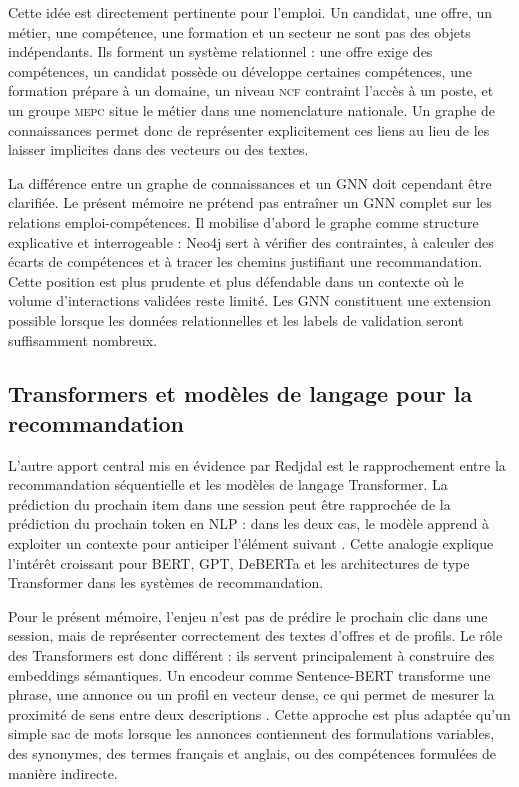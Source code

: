 \documentclass[12pt,twoside]{report}
\newcommand{\MEPC}{\textsc{mepc}}
\newcommand{\NCF}{\textsc{ncf}}
\begin{document}
Cette idée est directement pertinente pour l'emploi. Un candidat, une offre, un métier, une compétence, une formation et un secteur ne sont pas des objets indépendants. Ils forment un système relationnel : une offre exige des compétences, un candidat possède ou développe certaines compétences, une formation prépare à un domaine, un niveau \NCF{} contraint l'accès à un poste, et un groupe \MEPC{} situe le métier dans une nomenclature nationale. Un graphe de connaissances permet donc de représenter explicitement ces liens au lieu de les laisser implicites dans des vecteurs ou des textes.

La différence entre un graphe de connaissances et un GNN doit cependant être clarifiée. Le présent mémoire ne prétend pas entraîner un GNN complet sur les relations emploi-compétences. Il mobilise d'abord le graphe comme structure explicative et interrogeable : Neo4j sert à vérifier des contraintes, à calculer des écarts de compétences et à tracer les chemins justifiant une recommandation. Cette position est plus prudente et plus défendable dans un contexte où le volume d'interactions validées reste limité. Les GNN constituent une extension possible lorsque les données relationnelles et les labels de validation seront suffisamment nombreux.

\subsection{Transformers et modèles de langage pour la recommandation}
L'autre apport central mis en évidence par Redjdal est le rapprochement entre la recommandation séquentielle et les modèles de langage Transformer. La prédiction du prochain item dans une session peut être rapprochée de la prédiction du prochain token en NLP : dans les deux cas, le modèle apprend à exploiter un contexte pour anticiper l'élément suivant \cite{kang2018sasrec,moreira2021transformers4rec,redjdal2024sbr}. Cette analogie explique l'intérêt croissant pour BERT, GPT, DeBERTa et les architectures de type Transformer dans les systèmes de recommandation.

Pour le présent mémoire, l'enjeu n'est pas de prédire le prochain clic dans une session, mais de représenter correctement des textes d'offres et de profils. Le rôle des Transformers est donc différent : ils servent principalement à construire des embeddings sémantiques. Un encodeur comme Sentence-BERT transforme une phrase, une annonce ou un profil en vecteur dense, ce qui permet de mesurer la proximité de sens entre deux descriptions \cite{reimers2019sbert}. Cette approche est plus adaptée qu'un simple sac de mots lorsque les annonces contiennent des formulations variables, des synonymes, des termes français et anglais, ou des compétences formulées de manière indirecte.
\end{document}
